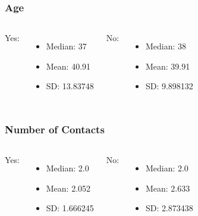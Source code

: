 \documentclass{beamer}
\begin{document}
\begin{frame}
	\frametitle{Age}
	\begin{columns}[c] %
		
    Yes:
		\begin{itemize}
			\item Median: 37
			\item Mean: 40.91
      \item SD: 13.83748
		\end{itemize}
		
    No:
		\begin{itemize}
			\item Median: 38
			\item Mean: 39.91
      \item SD: 9.898132
		\end{itemize}
		
	\end{columns}
\end{frame}

\begin{frame}
	\frametitle{Number of Contacts}
	\begin{columns}[c] %
		
    Yes:
		\begin{itemize}
			\item Median: 2.0
			\item Mean: 2.052
      \item SD: 1.666245
		\end{itemize}
		
    No:
		\begin{itemize}
			\item Median: 2.0
			\item Mean: 2.633 
      \item SD: 2.873438
		\end{itemize}
		
	\end{columns}
\end{frame}
\end{document}
